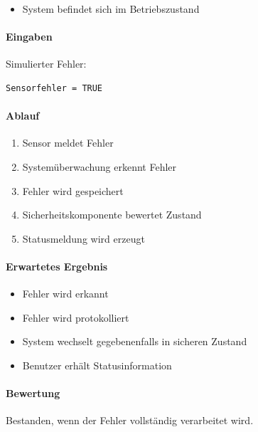 \documentclass[
  a4paper,
  12pt,
  DIV=12,        %
  parskip=half,  %
  headings=small %
]{scrartcl}
\theoremstyle{definition}
\providecommand{\tightlist}{%
  \setlength{\itemsep}{0pt}\setlength{\parskip}{0pt}}
\theoremstyle{definition}
\begin{document}
\begin{itemize}
\tightlist
\item
  System befindet sich im Betriebszustand
\end{itemize}

\paragraph{Eingaben}\label{eingaben-14}

Simulierter Fehler:

\begin{verbatim}
Sensorfehler = TRUE
\end{verbatim}

\paragraph{Ablauf}\label{ablauf-14}

\begin{enumerate}
\def\labelenumi{\arabic{enumi}.}
\tightlist
\item
  Sensor meldet Fehler
\item
  Systemüberwachung erkennt Fehler
\item
  Fehler wird gespeichert
\item
  Sicherheitskomponente bewertet Zustand
\item
  Statusmeldung wird erzeugt
\end{enumerate}

\paragraph{Erwartetes Ergebnis}\label{erwartetes-ergebnis-14}

\begin{itemize}
\tightlist
\item
  Fehler wird erkannt
\item
  Fehler wird protokolliert
\item
  System wechselt gegebenenfalls in sicheren Zustand
\item
  Benutzer erhält Statusinformation
\end{itemize}

\paragraph{Bewertung}\label{bewertung-14}

Bestanden, wenn der Fehler vollständig verarbeitet wird.
\end{document}
